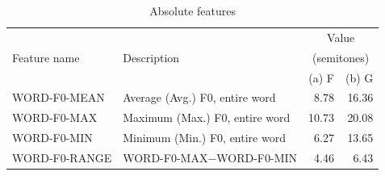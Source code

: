 \begin{table}[h!]
		\centering
		\caption[Features computed for fundamental frequency (F0) analysis]{Features computed for fundamental frequency (F0) analysis, and their values for the sample utterances of ``Flagge'' in \cref{fig:featuresexample}.%
		}
		{\renewcommand{\arraystretch}{1.25}%
		
		\begin{subtable}[h]{\textwidth}
		\caption{Absolute features}
		\begin{tabularx}{\textwidth}{p{}Xrr}
		\toprule
		\multirow{3}{*}{Feature name} 
									& \multirow{3}{*}{Description}
																	& \multicolumn{2}{c}{Value} \\
									&								& \multicolumn{2}{c}{(semitones)} \\							
					  				&																	&  (a) F		
					  																											& (b) G
					  																																\\
		\midrule
		WORD-F0-MEAN	& Average (Avg.) F0, entire word	 				& 8.78		& 16.36\\
		WORD-F0-MAX	& Maximum (Max.) F0, entire word				& 10.73	& 20.08\\
		WORD-F0-MIN		& Minimum (Min.) F0, entire word				& 6.27		& 13.65\\
		WORD-F0-RANGE & WORD-F0-MAX$-$WORD-F0-MIN			& 4.46		& 6.43\\


\end{tabularx}
\end{subtable}}
\end{table}
